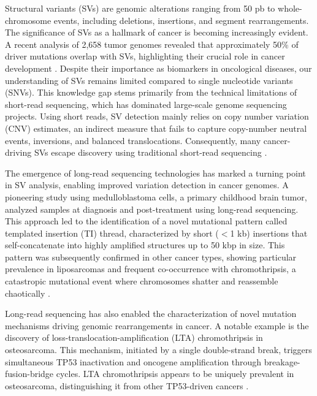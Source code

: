 Structural variants (SVs) are genomic alterations ranging from 50 pb to 
whole-chromosome events, including deletions, insertions, and segment 
rearrangements. The significance of SVs as a hallmark of cancer is becoming 
increasingly evident. A recent analysis of 2,658 tumor genomes revealed that 
approximately 50\% of driver mutations overlap with SVs, highlighting their 
crucial role in cancer development \cite{li_patterns_2020,menghi_tandem_2018}. 
Despite their importance as biomarkers in oncological diseases, our 
understanding of SVs remains limited compared to single nucleotide variants 
(SNVs). This knowledge gap stems primarily from the technical limitations of 
short-read sequencing, which has dominated large-scale genome sequencing 
projects. Using short reads, SV detection mainly relies on copy number variation 
(CNV) estimates, an indirect measure that fails to capture copy-number neutral 
events, inversions, and balanced translocations. Consequently, many 
cancer-driving SVs escape discovery using traditional short-read sequencing 
\cite{cameron_comprehensive_2019,abel_mapping_2020}.

The emergence of long-read sequencing technologies has marked a turning point in 
SV analysis, enabling improved variation detection in cancer genomes. A pioneering 
study using medulloblastoma cells, a primary childhood brain tumor, analyzed samples 
at diagnosis and post-treatment using long-read sequencing. This approach led to 
the identification of a novel mutational pattern called templated insertion (TI) 
thread, characterized by short ($<$1 kb) insertions that self-concatenate into highly 
amplified structures up to 50 kbp in size. This pattern was subsequently confirmed 
in other cancer types, showing particular prevalence in liposarcomas and frequent 
co-occurrence with chromothripsis, a catastropic mutational event where 
chromosomes shatter and reassemble chaotically \cite{rausch_long-read_2023}.

Long-read sequencing has also enabled the characterization of novel mutation 
mechanisms driving genomic rearrangements in cancer. A notable example is the 
discovery of loss-translocation-amplification (LTA) chromothripsis in osteosarcoma. 
This mechanism, initiated by a single double-strand break, triggers simultaneous 
TP53 inactivation and oncogene amplification through breakage-fusion-bridge cycles. 
LTA chromothripsis appears to be uniquely prevalent in osteosarcoma, distinguishing 
it from other TP53-driven cancers \cite{valle-inclan_ongoing_2025}.

